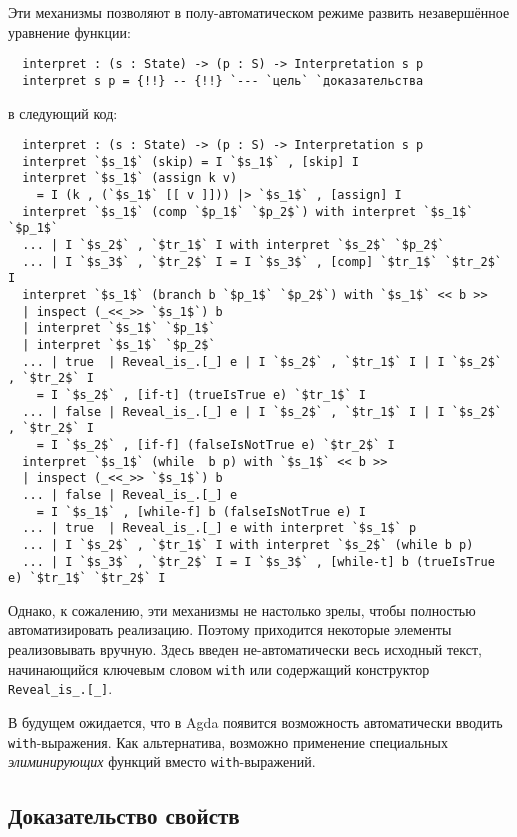\documentclass[aps,12pt,final,oneside,onecolumn,musixtex,superscriptaddress,centertags]{article}
\newcommand{\lcode}[1]{\lstinline[basicstyle=\ttfamily\normalsize]{#1}}
\begin{document}
  \noindent\begin{minipage}[c]{\linewidth}
  Эти механизмы позволяют в полу-автоматическом режиме развить незавершённое уравнение функции:
  \begin{lstlisting}
  interpret : (s : State) -> (p : S) -> Interpretation s p
  interpret s p = {!!} -- {!!} `--- `цель` `доказательства
  \end{lstlisting}
  в следующий код:
  \begin{lstlisting}
  interpret : (s : State) -> (p : S) -> Interpretation s p
  interpret `$s_1$` (skip) = I `$s_1$` , [skip] I
  interpret `$s_1$` (assign k v)
    = I (k , (`$s_1$` [[ v ]])) |> `$s_1$` , [assign] I
  interpret `$s_1$` (comp `$p_1$` `$p_2$`) with interpret `$s_1$` `$p_1$`
  ... | I `$s_2$` , `$tr_1$` I with interpret `$s_2$` `$p_2$`
  ... | I `$s_3$` , `$tr_2$` I = I `$s_3$` , [comp] `$tr_1$` `$tr_2$` I
  interpret `$s_1$` (branch b `$p_1$` `$p_2$`) with `$s_1$` << b >>
  | inspect (_<<_>> `$s_1$`) b
  | interpret `$s_1$` `$p_1$`
  | interpret `$s_1$` `$p_2$`
  ... | true  | Reveal_is_.[_] e | I `$s_2$` , `$tr_1$` I | I `$s_2$` , `$tr_2$` I
    = I `$s_2$` , [if-t] (trueIsTrue e) `$tr_1$` I
  ... | false | Reveal_is_.[_] e | I `$s_2$` , `$tr_1$` I | I `$s_2$` , `$tr_2$` I
    = I `$s_2$` , [if-f] (falseIsNotTrue e) `$tr_2$` I
  interpret `$s_1$` (while  b p) with `$s_1$` << b >>
  | inspect (_<<_>> `$s_1$`) b
  ... | false | Reveal_is_.[_] e
    = I `$s_1$` , [while-f] b (falseIsNotTrue e) I
  ... | true  | Reveal_is_.[_] e with interpret `$s_1$` p
  ... | I `$s_2$` , `$tr_1$` I with interpret `$s_2$` (while b p)
  ... | I `$s_3$` , `$tr_2$` I = I `$s_3$` , [while-t] b (trueIsTrue e) `$tr_1$` `$tr_2$` I
  \end{lstlisting}
  \end{minipage}

  Однако, к сожалению, эти механизмы не настолько зрелы, чтобы полностью автоматизировать реализацию. Поэтому приходится некоторые элементы реализовывать вручную. Здесь введен не-автоматически весь исходный текст, начинающийся ключевым словом \lcode{with} или содержащий конструктор \lcode{Reveal_is_.[_]}.

  В будущем ожидается, что в Agda появится возможность автоматически вводить \lcode{with}-выражения. Как альтернатива, возможно применение специальных \emph{элиминирующих} функций вместо \lcode{with}-выражений.

  \subsection{Доказательство свойств}
\end{document}

